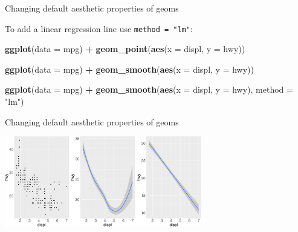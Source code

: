 \documentclass[ignorenonframetext,]{beamer}
\newenvironment{Shaded}{\begin{snugshade}}{\end{snugshade}}
\newcommand{\DataTypeTok}[1]{\textcolor[rgb]{0.13,0.29,0.53}{#1}}
\newcommand{\KeywordTok}[1]{\textcolor[rgb]{0.13,0.29,0.53}{\textbf{#1}}}
\newcommand{\NormalTok}[1]{#1}
\newcommand{\OperatorTok}[1]{\textcolor[rgb]{0.81,0.36,0.00}{\textbf{#1}}}
\newcommand{\StringTok}[1]{\textcolor[rgb]{0.31,0.60,0.02}{#1}}
\begin{document}
\begin{frame}[fragile]{Changing default aesthetic properties of geoms}
\protect\hypertarget{changing-default-aesthetic-properties-of-geoms-32}{}

To add a linear regression line use \texttt{method\ =\ "lm"}:

\begin{Shaded}
\begin{Highlighting}[]
\KeywordTok{ggplot}\NormalTok{(}\DataTypeTok{data =}\NormalTok{ mpg) }\OperatorTok{+}\StringTok{ }
\StringTok{  }\KeywordTok{geom_point}\NormalTok{(}\KeywordTok{aes}\NormalTok{(}\DataTypeTok{x =}\NormalTok{ displ, }\DataTypeTok{y =}\NormalTok{ hwy))}

\KeywordTok{ggplot}\NormalTok{(}\DataTypeTok{data =}\NormalTok{ mpg) }\OperatorTok{+}\StringTok{ }
\StringTok{  }\KeywordTok{geom_smooth}\NormalTok{(}\KeywordTok{aes}\NormalTok{(}\DataTypeTok{x =}\NormalTok{ displ, }\DataTypeTok{y =}\NormalTok{ hwy))}

\KeywordTok{ggplot}\NormalTok{(}\DataTypeTok{data =}\NormalTok{ mpg) }\OperatorTok{+}\StringTok{ }
\StringTok{  }\KeywordTok{geom_smooth}\NormalTok{(}\KeywordTok{aes}\NormalTok{(}\DataTypeTok{x =}\NormalTok{ displ, }\DataTypeTok{y =}\NormalTok{ hwy), }\DataTypeTok{method =} \StringTok{"lm"}\NormalTok{)}
\end{Highlighting}
\end{Shaded}

\end{frame}

\begin{frame}{Changing default aesthetic properties of geoms}
\protect\hypertarget{changing-default-aesthetic-properties-of-geoms-33}{}

\begin{center}\includegraphics[height=150px]{data-visualization_files/figure-beamer/unnamed-chunk-65-1} \end{center}

\end{frame}
\end{document}
